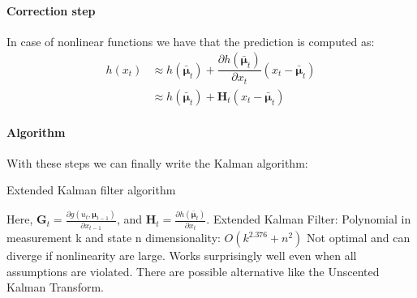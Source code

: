 \paragraph*{Correction step}
In case of nonlinear functions we have that the prediction is computed as: 
\begin{align*}
    h(x_t)  &\approx h(\bar{\boldsymbol{\mu}}_t)+\dfrac{\partial h(\bar{\boldsymbol{\mu}}_t)}{\partial x_t}(x_t-\bar{\boldsymbol{\mu}}_t) \\
            &\approx h(\bar{\boldsymbol{\mu}}_t)+\mathbf{H}_t(x_t-\bar{\boldsymbol{\mu}}_t)
\end{align*} 

\paragraph*{Algorithm}
With these steps we can finally write the Kalman algorithm: 
\begin{algorithm}[H]
    \caption{Extended Kalman filter algorithm}
        \begin{algorithmic}[1]
             
              
            \State{}
        \end{algorithmic}
\end{algorithm}
Here, $\mathbf{G}_t=\frac{\partial g(u_t,\boldsymbol{\mu}_{t-1})}{\partial x_{t-1}}$, and $\mathbf{H}_t=\frac{\partial h(\bar{\boldsymbol{\mu}}_t)}{\partial x_t}$. 
Extended Kalman Filter:
Polynomial in measurement k and state n dimensionality: $O(k^{2.376} + n^2)$
Not optimal and can diverge if nonlinearity are large.
Works surprisingly well even when all assumptions are violated.
There are possible alternative like the Unscented Kalman Transform.